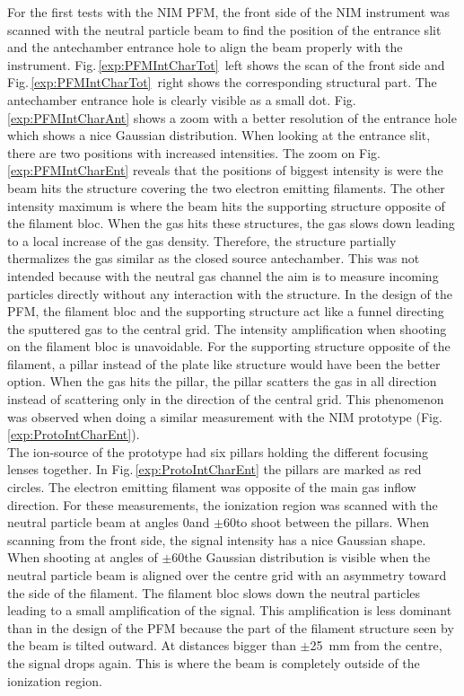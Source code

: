 	For the first tests with the NIM PFM, the front side of the NIM instrument was scanned with the neutral particle beam to find the position of the entrance slit and the antechamber entrance hole to align the beam properly with the instrument. Fig.\,\ref{exp:PFMIntCharTot}~left shows the scan of the front side and Fig.\,\ref{exp:PFMIntCharTot}~right shows the corresponding structural part. The antechamber entrance hole is clearly visible as a small dot. Fig.\,\ref{exp:PFMIntCharAnt} shows a zoom with a better resolution of the entrance hole which shows a nice Gaussian distribution. When looking at the entrance slit, there are two positions with increased intensities. The zoom on Fig.\,\ref{exp:PFMIntCharEnt} reveals that the positions of biggest intensity is were the beam hits the structure covering the two electron emitting filaments. The other intensity maximum is where the beam hits the supporting structure opposite of the filament bloc. When the gas hits these structures, the gas slows down leading to a local increase of the gas density. Therefore, the structure partially thermalizes the gas similar as the closed source antechamber. This was not intended because with the neutral gas channel the aim is to measure incoming particles directly without any interaction with the structure. In the design of the PFM, the filament bloc and the supporting structure act like a funnel directing the sputtered gas to the central grid. The intensity amplification when shooting on the filament bloc is unavoidable. For the supporting structure opposite of the filament, a pillar instead of the plate like structure would have been the better option. When the gas hits the pillar, the pillar scatters the gas in all direction instead of scattering only in the direction of the central grid. This phenomenon was observed when doing a similar measurement with the NIM prototype (Fig.\,\ref{exp:ProtoIntCharEnt}).\\
	The ion-source of the prototype had six pillars holding the different focusing lenses together. In Fig.\,\ref{exp:ProtoIntCharEnt} the pillars are marked as red circles. The electron emitting filament was opposite of the main gas inflow direction. For these measurements, the ionization region was scanned with the neutral particle beam at angles 0\degree and $\pm$60\degree to shoot between the pillars. When scanning from the front side, the signal intensity has a nice Gaussian shape. When shooting at angles of $\pm$60\degree the Gaussian distribution is visible when the neutral particle beam is aligned over the centre grid with an asymmetry toward the side of the filament. The filament bloc slows down the neutral particles leading to a small amplification of the signal. This amplification is less dominant than in the design of the PFM because the part of the filament structure seen by the beam is tilted outward. At distances bigger than $\pm$25~mm from the centre, the signal drops again. This is where the beam is completely outside of the ionization region.
